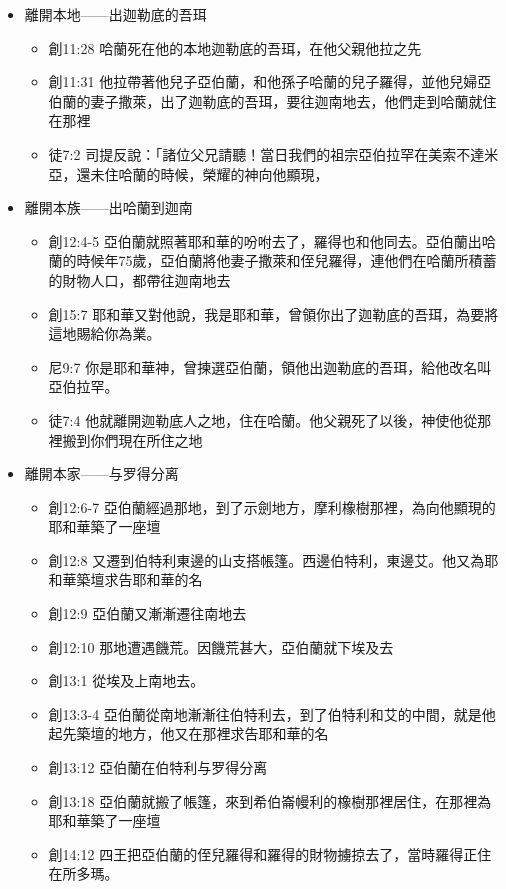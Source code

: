 \begin{itemize} 
\itemsep-.35em 
\item 離開本地——出迦勒底的吾珥
\begin{itemize} 
\itemsep-.35em 
\item 創11:28 哈蘭死在他的本地迦勒底的吾珥，在他父親他拉之先
\item 創11:31 他拉帶著他兒子亞伯蘭，和他孫子哈蘭的兒子羅得，並他兒婦亞伯蘭的妻子撒萊，出了迦勒底的吾珥，要往迦南地去，他們走到哈蘭就住在那裡
\item 徒7:2 司提反說：「諸位父兄請聽！當日我們的祖宗亞伯拉罕在美索不達米亞，還未住哈蘭的時候，榮耀的神向他顯現，
\end{itemize}
\item 離開本族——出哈蘭到迦南
\begin{itemize} 
\itemsep-.35em 
\item 創12:4-5 亞伯蘭就照著耶和華的吩咐去了，羅得也和他同去。亞伯蘭出哈蘭的時候年75歲，亞伯蘭將他妻子撒萊和侄兒羅得，連他們在哈蘭所積蓄的財物人口，都帶往迦南地去
\item 創15:7 耶和華又對他說，我是耶和華，曾領你出了迦勒底的吾珥，為要將這地賜給你為業。
\item 尼9:7 你是耶和華神，曾揀選亞伯蘭，領他出迦勒底的吾珥，給他改名叫亞伯拉罕。
\item 徒7:4 他就離開迦勒底人之地，住在哈蘭。他父親死了以後，神使他從那裡搬到你們現在所住之地
\end{itemize}
\item 離開本家——与罗得分离
\begin{itemize} 
\itemsep-.35em 
\item 創12:6-7 亞伯蘭經過那地，到了示劍地方，摩利橡樹那裡，為向他顯現的耶和華築了一座壇
\item 創12:8 又遷到伯特利東邊的山支搭帳篷。西邊伯特利，東邊艾。他又為耶和華築壇求告耶和華的名
\item 創12:9 亞伯蘭又漸漸遷往南地去
\item 創12:10 那地遭遇饑荒。因饑荒甚大，亞伯蘭就下埃及去
\item 創13:1 從埃及上南地去。
\item 創13:3-4 亞伯蘭從南地漸漸往伯特利去，到了伯特利和艾的中間，就是他起先築壇的地方，他又在那裡求告耶和華的名
\item 創13:12 亞伯蘭在伯特利与罗得分离
\item 創13:18 亞伯蘭就搬了帳篷，來到希伯崙幔利的橡樹那裡居住，在那裡為耶和華築了一座壇
\item 創14:12 四王把亞伯蘭的侄兒羅得和羅得的財物擄掠去了，當時羅得正住在所多瑪。

\end{itemize}
\end{itemize}
